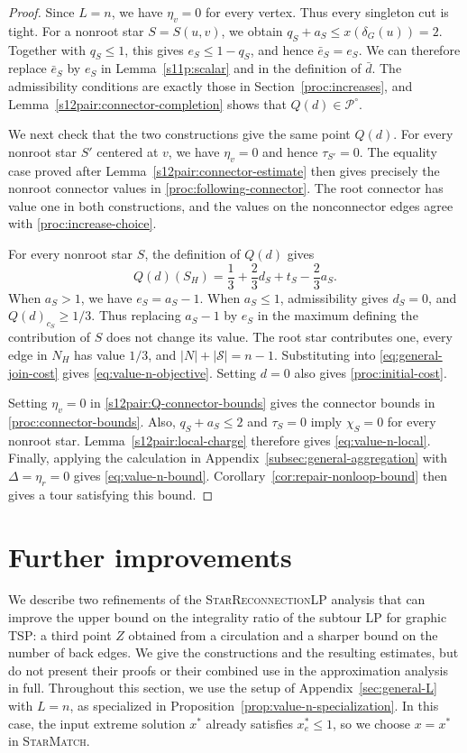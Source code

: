 \documentclass[11pt]{amsart}
\newcommand{\1}{\mathbbm{1}}
\newcommand{\ALG}{\textsc{StarMatch}}
\newcommand{\LPtwo}{\textsc{StarReconnectionLP}}
\begin{document}
\begin{proof}
{Since $L=n$, we have $\eta_v=0$ for every vertex.
Thus every singleton cut is tight.
For a nonroot star $S=S(u,v)$, we obtain
$q_S+a_S\le x(\delta_G(u))=2$.
Together with $q_S\le1$, this gives $e_S\le1-q_S$,
and hence $\bar e_S=e_S$.
We can therefore replace $\bar e_S$ by $e_S$ in
Lemma~\ref{s11p:scalar} and in the definition of $\bar d$.
The admissibility conditions are exactly those in
Section~\ref{proc:increases}, and
Lemma~\ref{s12pair:connector-completion} shows that
$Q(d)\in\mathcal P^\circ$.}

{We next check that the two constructions
give the same point $Q(d)$.
For every nonroot star $S'$ centered at $v$, we have
$\eta_v=0$ and hence $\tau_{S'}=0$.
The equality case proved after
Lemma~\ref{s12pair:connector-estimate} then gives precisely
the nonroot connector values in
\eqref{proc:following-connector}.
The root connector has value one in both constructions,
and the values on the nonconnector edges agree with
\eqref{proc:increase-choice}.}

{For every nonroot star $S$, the definition
of $Q(d)$ gives
\[
 Q(d)(S_H)=\frac13+\frac23d_S+t_S-\frac23a_S.
\]
When $a_S>1$, we have $e_S=a_S-1$.
When $a_S\le1$, admissibility gives $d_S=0$, and
$Q(d)_{c_S}\ge1/3$. Thus replacing $a_S-1$ by $e_S$
in the maximum defining the contribution of $S$ does
not change its value.
The root star contributes one, every edge in $N_H$ has
value $1/3$, and $|N|+|\mathcal S|=n-1$.
Substituting into \eqref{eq:general-join-cost} gives
\eqref{eq:value-n-objective}.
Setting $d=0$ also gives \eqref{proc:initial-cost}.}

{Setting $\eta_v=0$ in
\eqref{s12pair:Q-connector-bounds} gives the connector
bounds in \eqref{proc:connector-bounds}.
Also, $q_S+a_S\le2$ and $\tau_S=0$ imply $\chi_S=0$
for every nonroot star.
Lemma~\ref{s12pair:local-charge} therefore gives
\eqref{eq:value-n-local}.
Finally, applying the calculation in
Appendix~\ref{subsec:general-aggregation} with
$\Delta=\eta_r=0$ gives \eqref{eq:value-n-bound}.
Corollary~\ref{cor:repair-nonloop-bound} then gives a tour
satisfying this bound.}
\end{proof}
\pagebreak




\section{Further improvements}
\label{sec:further-improvements}

We describe two refinements of the \LPtwo{} analysis that can
improve the upper bound on the integrality ratio of the subtour LP
for graphic TSP: a third point $Z$ obtained from a
circulation and a sharper bound on the number of back edges.
We give the constructions and the resulting estimates, but do not
present their proofs or their combined use in the approximation
analysis in full. {Throughout this section, we use
the setup of Appendix~\ref{sec:general-L} with $L=n$, as
specialized in Proposition~\ref{prop:value-n-specialization}.}
In this case, the input
extreme solution $x^*$ already satisfies $x^*_e\le1$, so we
choose $x=x^*$ in \ALG{}.
\end{document}
